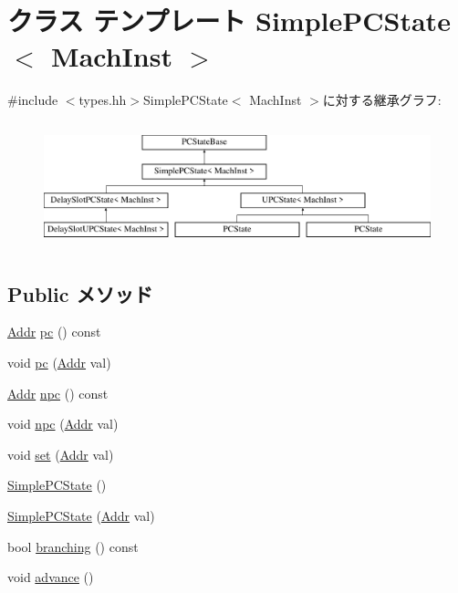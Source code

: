 \hypertarget{classGenericISA_1_1SimplePCState}{
\section{クラス テンプレート SimplePCState$<$ MachInst $>$}
\label{classGenericISA_1_1SimplePCState}
}


{\ttfamily \#include $<$types.hh$>$}SimplePCState$<$ MachInst $>$に対する継承グラフ:\begin{figure}[H]
\begin{center}
\leavevmode
\includegraphics[height=3.69637cm]{classGenericISA_1_1SimplePCState}
\end{center}
\end{figure}
\subsection*{Public メソッド}
\begin{DoxyCompactItemize}
\item 
\hyperlink{base_2types_8hh_af1bb03d6a4ee096394a6749f0a169232}{Addr} \hyperlink{classGenericISA_1_1SimplePCState_a4012b666ba851e747ea4229c7cf55c5b}{pc} () const 
\item 
void \hyperlink{classGenericISA_1_1SimplePCState_a890f32c7e075e8c64c1c50252b1be15e}{pc} (\hyperlink{base_2types_8hh_af1bb03d6a4ee096394a6749f0a169232}{Addr} val)
\item 
\hyperlink{base_2types_8hh_af1bb03d6a4ee096394a6749f0a169232}{Addr} \hyperlink{classGenericISA_1_1SimplePCState_ae606c6164a927e305006d93c7fe0b0bd}{npc} () const 
\item 
void \hyperlink{classGenericISA_1_1SimplePCState_aa18dbf528ad5e6696b84d1f5a7cab71b}{npc} (\hyperlink{base_2types_8hh_af1bb03d6a4ee096394a6749f0a169232}{Addr} val)
\item 
void \hyperlink{classGenericISA_1_1SimplePCState_a9a5b900e841dd75dc81970850547918f}{set} (\hyperlink{base_2types_8hh_af1bb03d6a4ee096394a6749f0a169232}{Addr} val)
\item 
\hyperlink{classGenericISA_1_1SimplePCState_ade74699701e72921ce51377b7fb0fcd8}{SimplePCState} ()
\item 
\hyperlink{classGenericISA_1_1SimplePCState_aef426796c6d2f489ce04fc7ca7caf147}{SimplePCState} (\hyperlink{base_2types_8hh_af1bb03d6a4ee096394a6749f0a169232}{Addr} val)
\item 
bool \hyperlink{classGenericISA_1_1SimplePCState_ae3f0eb15a9382eefff6b00cf7999c2e3}{branching} () const 
\item 
void \hyperlink{classGenericISA_1_1SimplePCState_a8903a4e9f3d5fb42d0faa9d53e21d85c}{advance} ()
\end{DoxyCompactItemize}

